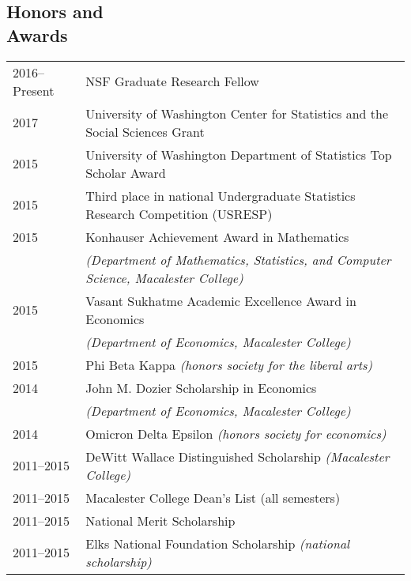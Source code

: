 \documentclass[margin,centered]{res}
\begin{document}
\begin{resume}





\newpage

\section{\sc Honors and\\ Awards}

\begin{tabular}{@{}p{0.8in}p{4in}}
2016--Present & NSF Graduate Research Fellow\\
2017 & University of Washington Center for Statistics and the Social Sciences Grant\\
2015 & University of Washington Department of Statistics Top Scholar Award\\
2015 & Third place in national Undergraduate Statistics Research Competition (USRESP)\\
2015 & Konhauser Achievement Award in Mathematics \\
&\textit{(Department of Mathematics, Statistics, and Computer Science, Macalester College)}\\
2015 & Vasant Sukhatme Academic Excellence Award in Economics\\& \textit{(Department of Economics, Macalester College)}\\
2015 & Phi Beta Kappa \textit{(honors society for the liberal arts)}\\
2014 & John M. Dozier Scholarship in Economics \\ &\textit{(Department of Economics, Macalester College)}\\
2014 & Omicron Delta Epsilon \textit{(honors society for economics)}\\
2011--2015 & DeWitt Wallace Distinguished Scholarship \textit{(Macalester College)}\\
2011--2015 & Macalester College Dean's List (all semesters)\\
2011--2015 & National Merit Scholarship \\
2011--2015 & Elks National Foundation Scholarship \textit{(national scholarship)}\\
\end{tabular}






\end{resume}
\end{document}
